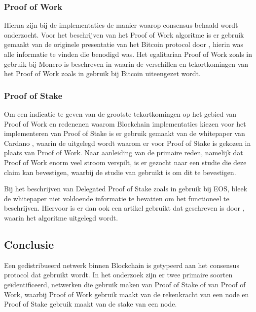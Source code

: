 \subsubsection{Proof of Work}
Hierna zijn bij de implementaties de manier waarop consensus behaald wordt onderzocht. Voor het beschrijven van het Proof of Work algoritme is er gebruik gemaakt van de originele presentatie van het Bitcoin protocol door \cite{nakamoto2008bitcoin}, hierin was alle informatie te vinden die benodigd was. Het egalitarian Proof of Work zoals in gebruik bij Monero is beschreven in \cite{van2013cryptonote} waarin de verschillen en tekortkomingen van het Proof of Work zoals in gebruik bij Bitcoin uiteengezet wordt.

\newpage
\subsubsection{Proof of Stake}
Om een indicatie te geven van de grootste tekortkomingen op het gebied van Proof of Work en redenenen waarom Blockchain implementaties kiezen voor het implementeren van Proof of Stake is er gebruik gemaakt van de whitepaper van Cardano \cite{kiayias2017ouroboros}, waarin de uitgelegd wordt waarom er voor Proof of Stake is gekozen in plaats van Proof of Work. Naar aanleiding van de primaire reden, namelijk dat Proof of Work enorm veel stroom verspilt, is er gezocht naar een studie die deze claim kan bevestigen, waarbij de studie van \cite{ODwyer:Bitcoin} gebruikt is om dit te bevestigen.

Bij het beschrijven van Delegated Proof of Stake zoals in gebruik bij EOS, bleek de whitepaper niet voldoende informatie te bevatten om het functioneel te beschrijven. Hiervoor is er dan ook een artikel gebruikt dat geschreven is door \cite{steemit:eos_dpos}, waarin het algoritme uitgelegd wordt.

\subsection{Conclusie}

Een gedistribueerd netwerk binnen Blockchain is getypeerd aan het consensus protocol dat gebruikt wordt. In het onderzoek zijn er twee primaire soorten geïdentificeerd, netwerken die gebruik maken van Proof of Stake of van Proof of Work, waarbij Proof of Work gebruik maakt van de rekenkracht van een \gls{node} en Proof of Stake gebruik maakt van de \gls{stake} van een \gls{node}.